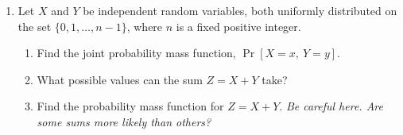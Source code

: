 \documentclass[12pt]{article}
\begin{document}
\begin{enumerate}

	\item Let $X$ and $Y$ be independent random variables, both uniformly distributed on the set $\{0, 1, \ldots, n-1\}$, where $n$ is a fixed positive integer.
	\begin{enumerate}
		\item Find the joint probability mass function, $\Pr[X = x,\ Y = y]$.
		\vfill

		\item What possible values can the sum $Z = X+Y$ take?

		\vfill

		\item Find the probability mass function for $Z = X+Y$. \textit{Be careful here. Are some sums more likely than others?}
	\end{enumerate}

	\vfill\null
\end{enumerate}
\end{document}
